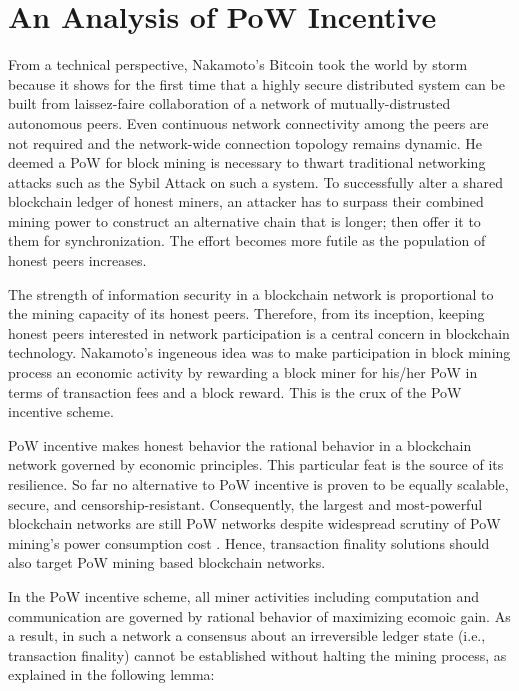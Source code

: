 \section{An Analysis of PoW Incentive}
\label{s-incentive}
From a technical perspective, Nakamoto's Bitcoin \cite{bitcoin} took the world by storm because it shows for the first time that a highly secure distributed system can be built from laissez-faire collaboration of a network of mutually-distrusted autonomous peers. Even continuous network connectivity among the peers are not required and the network-wide connection topology remains dynamic. He deemed a PoW for block mining is necessary to thwart traditional networking attacks such as the Sybil Attack \cite{Douceur:2002:SA:646334.687813} on such a system. To successfully alter a shared blockchain ledger of honest miners, an attacker has to surpass their combined mining power to construct an alternative chain that is longer; then offer it to them for synchronization. The effort becomes more futile as the population of honest peers increases.

The strength of information security in a blockchain network is proportional to the mining capacity of its honest peers. Therefore, from its inception, keeping honest peers interested in network participation is a central concern in blockchain technology. Nakamoto's ingeneous idea was to make participation in block mining process an economic activity \cite{Kroll2013TheEO} by rewarding a block miner for his/her PoW in terms of transaction fees and a block reward. This is the crux of the PoW incentive scheme.

PoW incentive makes honest behavior the rational behavior \cite{bitcoin} in a blockchain network governed by economic principles. This particular feat is the source of its resilience. So far no alternative to PoW incentive is proven to be equally scalable, secure, and censorship-resistant. Consequently, the largest and most-powerful blockchain networks are still PoW networks despite widespread scrutiny of PoW mining's power consumption cost \cite{powcost}. Hence, transaction finality solutions should also target PoW mining based blockchain networks.

In the PoW incentive scheme, all miner activities including computation and communication are governed by rational behavior of maximizing ecomoic gain. As a result, in such a network a consensus about an irreversible ledger state (i.e., transaction finality) cannot be established without halting the mining process, as explained in the following lemma:

